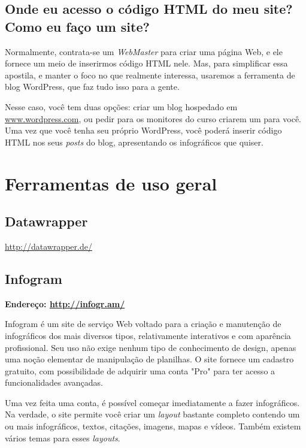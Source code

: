 \documentclass[12pt,onecolumn]{article}
\begin{document}
  \subsection{Onde eu acesso o código HTML do meu site? Como eu faço um site?}
    Normalmente, contrata-se um \textit{WebMaster} para criar uma página Web, e
    ele fornece um meio de inserirmos código HTML nele. Mas, para simplificar
    essa apostila, e manter o foco no que realmente interessa, usaremos a
    ferramenta de blog WordPress, que faz tudo isso para a gente.
    
    Nesse caso, você tem duas opções: criar um blog hospedado em
    \url{www.wordpress.com}, ou pedir para os monitores do curso criarem um
    para você\footnotemark. Uma vez que você tenha seu próprio WordPress, você
    poderá inserir código HTML nos seus \textit{posts} do blog, apresentando os
    infográficos que quiser.
    

\clearpage
\section{Ferramentas de uso geral}
  \subsection{Datawrapper}
    \url{http://datawrapper.de/}

  \subsection{Infogram}
    \textbf{Endereço: \url{http://infogr.am/}}
    
    Infogram é um site de serviço Web voltado para a criação e manutenção de
    infográficos dos mais diversos tipos, relativamente interativos e com
    aparência profissional. Seu uso não exige nenhum tipo de conhecimento de
    design, apenas uma noção elementar de manipulação de planilhas. O site fornece
    um cadastro gratuito, com possibilidade de adquirir uma conta "Pro" para ter
    acesso a funcionalidades avançadas.
    
    Uma vez feita uma conta, é possível começar imediatamente a fazer
    infográficos. Na verdade, o site permite você criar um \textit{layout}
    bastante completo contendo um ou mais infográficos, textos, citações, imagens,
    mapas e vídeos. Também existem vários temas para esses \textit{layouts}.
    
\end{document}

